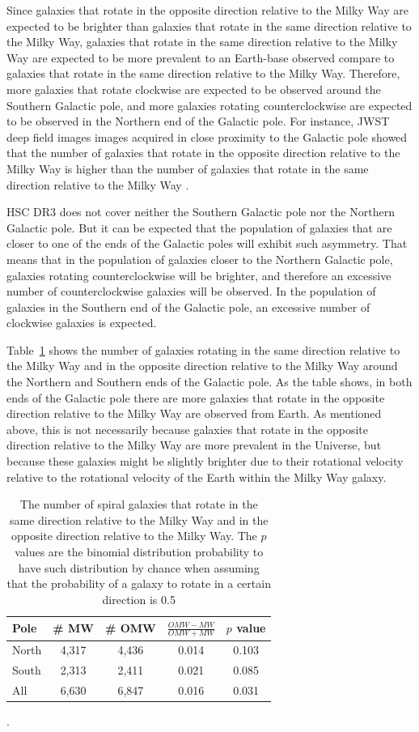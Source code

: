\documentclass[final,5p,times,twocolumn]{article}
\begin{document}
Since galaxies that rotate in the opposite direction relative to the Milky Way are expected to be brighter than galaxies that rotate in the same direction relative to the Milky Way, galaxies that rotate in the same direction relative to the Milky Way are expected to be more prevalent to an Earth-base observed compare to galaxies that rotate in the same direction relative to the Milky Way. Therefore, more galaxies that rotate clockwise are expected to be observed around the Southern Galactic pole, and more galaxies rotating counterclockwise are expected to be observed in the Northern end of the Galactic pole. For instance, JWST deep field images images acquired in close proximity to the Galactic pole showed that the number of galaxies that rotate in the opposite direction relative to the Milky Way is higher than the number of galaxies that rotate in the same direction relative to the Milky Way \citep{shamir2024galaxy}.

HSC DR3 does not cover neither the Southern Galactic pole nor the Northern Galactic pole. But it can be expected that the population of galaxies that are closer to one of the ends of the Galactic poles will exhibit such asymmetry. That means that in the population of galaxies closer to the Northern Galactic pole, galaxies rotating counterclockwise will be brighter, and therefore an excessive number of counterclockwise galaxies will be observed. In the population of galaxies in the Southern end of the Galactic pole, an excessive number of clockwise galaxies is expected. 

Table~\ref{poles} shows the number of galaxies rotating in the same direction relative to the Milky Way and in the opposite direction relative to the Milky Way around the Northern and Southern ends of the Galactic pole. As the table shows, in both ends of the Galactic pole there are more galaxies that rotate in the opposite direction relative to the Milky Way are observed from Earth. As mentioned above, this is not necessarily because galaxies that rotate in the opposite direction relative to the Milky Way are more prevalent in the Universe, but because these galaxies might be slightly brighter due to their rotational velocity relative to the rotational velocity of the Earth within the Milky Way galaxy.

\begin{table}[h]
\centering
\scriptsize
\begin{tabular}{lcccc}
\hline
Pole & \# MW & \# OMW &  $\frac{OMW-MW}{OMW+MW}$  & $p$ value \\
\hline
North  & 4,317   &  4,436  &  0.014  &  0.103 \\   
South  & 2,313   & 2,411  &  0.021  &  0.085 \\  
All    & 6,630   & 6,847     &  0.016  & 0.031  \\
\hline
\end{tabular}
\caption{The number of spiral galaxies that rotate in the same direction relative to the Milky Way and in the opposite direction relative to the Milky Way. The $p$ values are the binomial distribution probability to have such distribution by chance when assuming that the probability of a galaxy to rotate in a certain direction is 0.5}. 
\label{poles}
\end{table}
\end{document}
